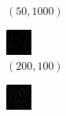 \documentclass[a4paper, landscape]{article}
\begin{document}
\begin{figure}[H]
\begin{subfigure}{0.09\linewidth}
        \caption*{$(50, 1000)$}
    \end{subfigure}
    \begin{subfigure}{0.09\linewidth}
        \centering
        \includegraphics[width=\linewidth]{iht/k = 200, m = 100.png}
        \caption*{$(200, 100)$}
    \end{subfigure}
    \begin{subfigure}{0.09\linewidth}
        \centering
        \includegraphics[width=\linewidth]{iht/k = 200, m = 200.png}

\end{subfigure}
\end{figure}
\end{document}
